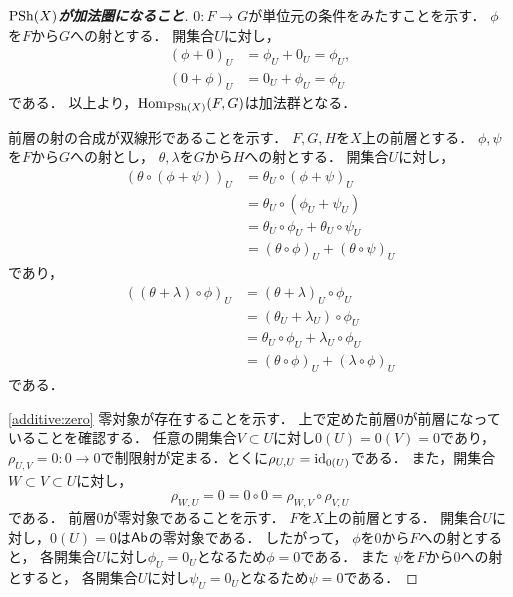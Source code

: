 \begin{proof}[\textbf{\(\mathrm{PSh}(X)\)が加法圏になること}]
    \(0\colon F\to G\)が単位元の条件をみたすことを示す．
    \(\phi\)を\(F\)から\(G\)への射とする．
    開集合\(U\)に対し，
    \begin{align*}
        (\phi+0)_U&=\phi_{U}+0_{U}=\phi_{U},\\
        (0+\phi)_U&=0_U+\phi_U=\phi_{U}
    \end{align*}
    である．
    以上より，\(\mathop{\mathrm{Hom}}\nolimits_{\mathrm{PSh}(X)}(F,G)\)は加法群となる．

    前層の射の合成が双線形であることを示す．
    \(F,G,H\)を\(X\)上の前層とする．
    \(\phi,\psi\)を\(F\)から\(G\)への射とし，
    \(\theta,\lambda\)を\(G\)から\(H\)への射とする．
    開集合\(U\)に対し，
    \begin{align*}
        (\theta\circ(\phi+\psi))_U
        &=\theta_U\circ(\phi+\psi)_U\\
        &=\theta_U\circ(\phi_U+\psi_U)\\
        &=\theta_U\circ\phi_U+\theta_U\circ\psi_U\\
        &=(\theta\circ\phi)_U+(\theta\circ\psi)_U
    \end{align*}
    であり，
    \begin{align*}
        ((\theta+\lambda)\circ\phi)_U
        &=(\theta+\lambda)_U\circ\phi_U\\
        &=(\theta_U+\lambda_U)\circ\phi_U\\
        &=\theta_U\circ\phi_U+\lambda_U\circ\phi_U\\
        &=(\theta\circ\phi)_U+(\lambda\circ\phi)_U
    \end{align*}
    である．

    \eqref{additive:zero} 
    零対象が存在することを示す．
    上で定めた前層\(0\)が前層になっていることを確認する．
    任意の開集合\(V\subset U\)に対し\(0(U)=0(V)=0\)であり，\(
        \rho_{U,V}=0\colon 0\to 0
    \)で制限射が定まる．とくに\(\rho_{U,U}=\mathop{\mathrm{id}}\nolimits_{0(U)}\)である．
    また，開集合\(W\subset V\subset U\)に対し，
    \[
        \rho_{W,U}=0=0\circ0=\rho_{W,V}\circ\rho_{V,U}
    \]
    である．
    前層\(0\)が零対象であることを示す．
    \(F\)を\(X\)上の前層とする．
    開集合\(U\)に対し，\(0(U)=0\)は\(\mathop{\textsf{Ab}}\nolimits\)の零対象である．
    したがって，
    \(\phi\)を\(0\)から\(F\)への射とすると，
    各開集合\(U\)に対し\(\phi_U=0_U\)となるため\(\phi=0\)である．
    また
    \(\psi\)を\(F\)から\(0\)への射とすると，
    各開集合\(U\)に対し\(\psi_U=0_U\)となるため\(\psi=0\)である．


\end{proof}
